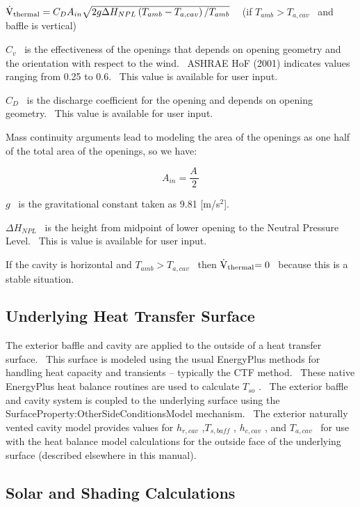 {\({{\rm{\rlap{--} \dot V}}_{{\rm{thermal}}}} = {C_D}{A_{in}}\sqrt {2g\Delta {H_{NPL}}\left( {{T_{amb}} - {T_{a,cav}}} \right)/{T_{amb}}}\) ~ (if \(T_{amb} > T_{a,cav}\) ~and baffle is vertical)

\({C_v}\) ~is the effectiveness of the openings that depends on opening geometry and the orientation with respect to the wind.~ ASHRAE HoF (2001) indicates values ranging from 0.25 to 0.6.~ This value is available for user input.

\({C_D}\) ~is the discharge coefficient for the opening and depends on opening geometry.~ This value is available for user input.

Mass continuity arguments lead to modeling the area of the openings as one half of the total area of the openings, so we have:

\begin{equation}
{A_{in}} = \frac{{A\,}}{2}
\end{equation}

\(g\) ~is the gravitational constant taken as 9.81 {[}m/s\(^{2}\){]}.

\(\Delta {H_{NPL}}\) ~is the height from midpoint of lower opening to the Neutral Pressure Level.~ This is value is available for user input.

If the cavity is horizontal and \(T_{amb} > T_{a,cav}\) ~then \({{\rm{\rlap{--} \dot V}}_{{\rm{thermal}}}}{\rm{ = 0}}\) ~because this is a stable situation.

\subsection{Underlying Heat Transfer Surface}\label{underlying-heat-transfer-surface}

The exterior baffle and cavity are applied to the outside of a heat transfer surface.~ This surface is modeled using the usual EnergyPlus methods for handling heat capacity and transients -- typically the CTF method.~ These native EnergyPlus heat balance routines are used to calculate \({T_{so}}\) .~ The exterior baffle and cavity system is coupled to the underlying surface using the SurfaceProperty:OtherSideConditionsModel mechanism.~ The exterior naturally vented cavity model provides values for \({h_{r,cav}}\) ,\({T_{s,baff}}\) , \({h_{c,cav}}\) , and \({T_{a,cav}}\) ~for use with the heat balance model calculations for the outside face of the underlying surface (described elsewhere in this manual).

\subsection{Solar and Shading Calculations}\label{solar-and-shading-calculations}

}
